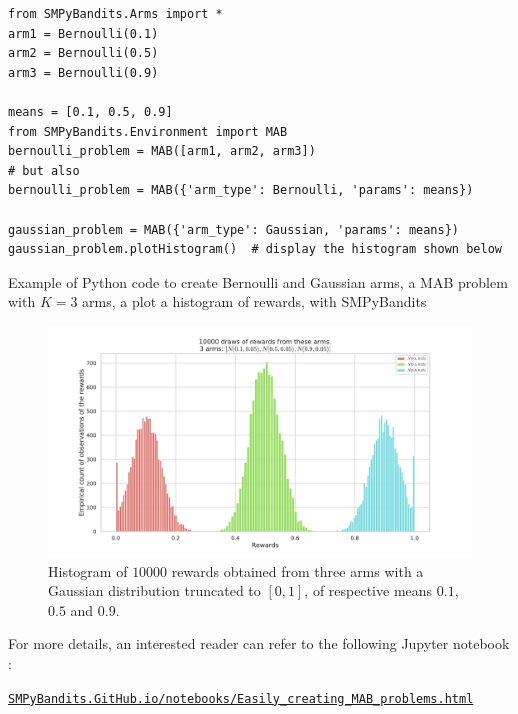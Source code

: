 \begin{small}
\begin{listing}[h!]
    \begin{verbatim}
from SMPyBandits.Arms import *
arm1 = Bernoulli(0.1)
arm2 = Bernoulli(0.5)
arm3 = Bernoulli(0.9)

means = [0.1, 0.5, 0.9]
from SMPyBandits.Environment import MAB
bernoulli_problem = MAB([arm1, arm2, arm3])
# but also
bernoulli_problem = MAB({'arm_type': Bernoulli, 'params': means})

gaussian_problem = MAB({'arm_type': Gaussian, 'params': means})
gaussian_problem.plotHistogram()  # display the histogram shown below
    \end{verbatim}
    \caption{Example of Python code to create Bernoulli and Gaussian arms, a MAB problem with $K=3$ arms, a plot a histogram of rewards, with SMPyBandits}
    \label{lst:3:pythonCodeCreateProblem}
\end{listing}
\end{small}

\begin{figure}[h!]  %
	\centering
	\includegraphics[width=0.75\linewidth]{exampleOfRewards.pdf}
	\caption{Histogram of $10000$ \iid{} rewards obtained from three arms with a Gaussian distribution truncated to $[0,1]$, of respective means $0.1$, $0.5$ and $0.9$.}
	\label{fig:3:exampleOfRewards}
\end{figure}

For more details, an interested reader can refer to the following Jupyter notebook \cite{jupyter}:
\begin{small}
    \href{https://smpybandits.github.io/notebooks/Easily_creating_MAB_problems.html}{\texttt{SMPyBandits.GitHub.io/notebooks/Easily\_creating\_MAB\_problems.html}}
\end{small}

